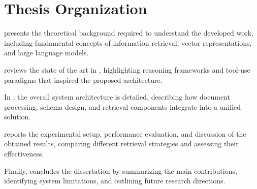 \section{Thesis Organization}

 presents the theoretical background required to understand the developed work, including fundamental concepts of information retrieval, vector representations, and large language models. 

 reviews the state of the art in , highlighting reasoning frameworks and tool-use paradigms that inspired the proposed architecture. 


In , the overall system architecture is detailed, describing how document processing, schema design, and retrieval components integrate into a unified solution.

 reports the experimental setup, performance evaluation, and discussion of the obtained results, comparing different retrieval strategies and assessing their effectiveness. 

Finally,  concludes the dissertation by summarizing the main contributions, identifying system limitations, and outlining future research directions.
